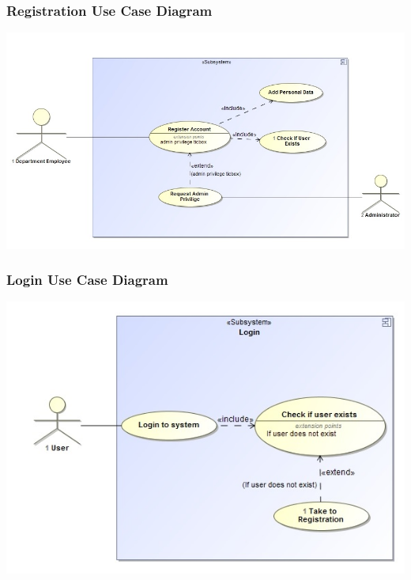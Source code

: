 \documentclass[a4paper,12pt]{article}
\begin{document}
	\subsubsection{Registration Use Case Diagram}
	\includegraphics[width=1\textwidth]{./Registration.jpg}\\[1.5cm]
	 
	\subsubsection{Login Use Case Diagram}
	\includegraphics[width=1\textwidth]{./Login.jpg}\\[1.5cm] 
	
\end{document}
